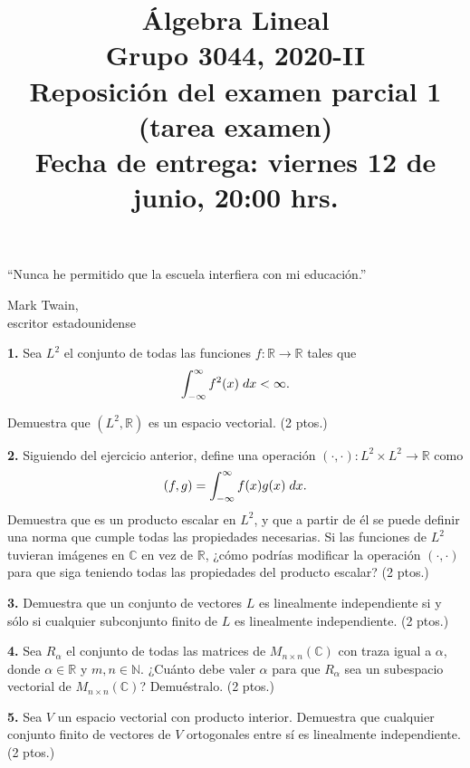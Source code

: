\documentclass[a4paper]{article}
\begin{document}
\title{Álgebra Lineal \\ Grupo 3044, 2020-II \\ Reposición del examen parcial 1 (tarea examen) \\ Fecha de entrega: viernes 12 de junio, 20:00 hrs.}
\date{}
\maketitle

\epigraph{``Nunca he permitido que la escuela interfiera con mi educación.''}{\textemdash Mark Twain, \\ escritor estadounidense}

\vspace{5mm}
\textbf{1.} Sea $L^2$ el conjunto de todas las funciones $f:\mathbb{R}\to\mathbb{R}$ tales que $$\int_{-\infty}^{\infty} f^2(x) \hspace{1mm} dx < \infty.$$

\noindent Demuestra que $(L^2,\mathbb{R})$ es un espacio vectorial. (2 ptos.)

\vspace{5mm}
\textbf{2.} Siguiendo del ejercicio anterior, define una operación $(\cdot, \cdot):L^2\times L^2\to\mathbb{R}$ como $$(f,g) = \int_{-\infty}^{\infty} f(x)g(x) \hspace{1mm} dx. $$ Demuestra que es un producto escalar en $L^2$, y que a partir de él se puede definir una norma que cumple todas las propiedades necesarias. Si las funciones de $L^2$ tuvieran imágenes en $\mathbb{C}$ en vez de $\mathbb{R}$, ¿cómo podrías modificar la operación $(\cdot, \cdot)$ para que siga teniendo todas las propiedades del producto escalar? (2 ptos.)

\vspace{5mm}
\textbf{3.} Demuestra que un conjunto de vectores $L$ es linealmente independiente si y sólo si cualquier subconjunto finito de $L$ es linealmente independiente. (2 ptos.)

\vspace{5mm}
\textbf{4.} Sea $R_{\alpha}$ el conjunto de todas las matrices de $M_{n\times n}(\mathbb{C})$ con traza igual a $\alpha$, donde $\alpha\in\mathbb{R}$ y $m,n\in\mathbb{N}$. ¿Cuánto debe valer $\alpha$ para que $R_{\alpha}$ sea un subespacio vectorial de $M_{n\times n}(\mathbb{C})$? Demuéstralo. (2 ptos.)

\vspace{5mm}
\textbf{5.} Sea $V$ un espacio vectorial con producto interior. Demuestra que cualquier conjunto finito de vectores de $V$ ortogonales entre sí es linealmente independiente. (2 ptos.)
\end{document}
